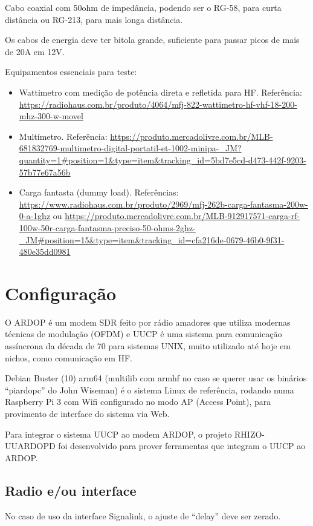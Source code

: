 \documentclass[11pt,a4paper]{article}
\begin{document}
Cabo coaxial com 50ohm de impedância, podendo ser o RG-58, para curta distância ou RG-213, para mais longa distância.

Os cabos de energia deve ter bitola grande, suficiente para passar picos de mais de 20A em 12V.

Equipamentos essenciais para teste:
\begin{itemize}
\item Wattimetro com medição de potência direta e refletida para HF. Referência: \url{https://radiohaus.com.br/produto/4064/mfj-822-wattimetro-hf-vhf-18-200-mhz-300-w-movel}
\item Multímetro. Referência: \url{https://produto.mercadolivre.com.br/MLB-681832769-multimetro-digital-portatil-et-1002-minipa-_JM?quantity=1#position=1&type=item&tracking_id=5bd7e5cd-d473-442f-9203-57b77e67a56b}
\item Carga fantasta (dummy load). Referências: \url{https://www.radiohaus.com.br/produto/2969/mfj-262b-carga-fantasma-200w-0-a-1ghz} ou \url{https://produto.mercadolivre.com.br/MLB-912917571-carga-rf-100w-50r-carga-fantasma-preciso-50-ohms-2ghz-_JM#position=15&type=item&tracking_id=cfa216de-0679-46b0-9f31-480e35dd0981}
\end{itemize}


\section{Configuração}

O ARDOP é um modem SDR feito por rádio amadores que utiliza modernas
técnicas de modulação (OFDM) e UUCP é uma sistema para comunicação
assíncrona da década de 70 para sistemas UNIX, muito utilizado até
hoje em nichos, como comunicação em HF.

Debian Buster (10) arm64 (multilib com armhf no caso se querer usar os
binários ``piardopc'' do John Wiseman) é o sistema Linux de referência,
rodando numa Raspberry Pi 3 com Wifi configurado no modo AP (Access Point),
para provimento de interface do sistema via Web.

Para integrar o sistema UUCP ao modem ARDOP, o projeto RHIZO-UUARDOPD
foi desenvolvido para prover ferramentas que integram o UUCP ao ARDOP.

\subsection{Radio e/ou interface}

No caso de uso da interface Signalink, o ajuste de ``delay'' deve ser
zerado.
\end{document}
